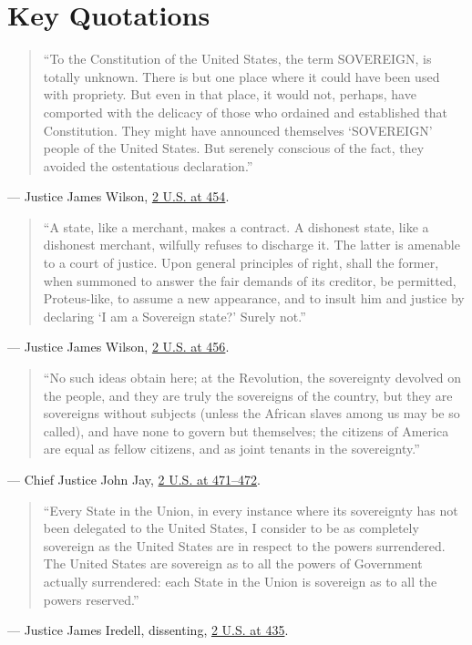 \documentclass[12pt]{article}
\begin{document}
\section{Key Quotations}
\begin{quote}
``To the Constitution of the United States, the term SOVEREIGN, is totally unknown. There is but one place where it could have been used with propriety. But even in that place, it would not, perhaps, have comported with the delicacy of those who ordained and established that Constitution. They might have announced themselves `SOVEREIGN' people of the United States. But serenely conscious of the fact, they avoided the ostentatious declaration.''
\end{quote}
\noindent --- Justice James Wilson, \href{https://supreme.justia.com/cases/federal/us/2/419/}{2 U.S. at 454}.

\begin{quote}
``A state, like a merchant, makes a contract. A dishonest state, like a dishonest merchant, wilfully refuses to discharge it. The latter is amenable to a court of justice. Upon general principles of right, shall the former, when summoned to answer the fair demands of its creditor, be permitted, Proteus-like, to assume a new appearance, and to insult him and justice by declaring `I am a Sovereign state?' Surely not.''
\end{quote}
\noindent --- Justice James Wilson, \href{https://supreme.justia.com/cases/federal/us/2/419/}{2 U.S. at 456}.

\begin{quote}
``No such ideas obtain here; at the Revolution, the sovereignty devolved on the people, and they are truly the sovereigns of the country, but they are sovereigns without subjects (unless the African slaves among us may be so called), and have none to govern but themselves; the citizens of America are equal as fellow citizens, and as joint tenants in the sovereignty.''
\end{quote}
\noindent --- Chief Justice John Jay, \href{https://supreme.justia.com/cases/federal/us/2/419/}{2 U.S. at 471--472}.

\begin{quote}
``Every State in the Union, in every instance where its sovereignty has not been delegated to the United States, I consider to be as completely sovereign as the United States are in respect to the powers surrendered. The United States are sovereign as to all the powers of Government actually surrendered: each State in the Union is sovereign as to all the powers reserved.''
\end{quote}
\noindent --- Justice James Iredell, dissenting, \href{https://supreme.justia.com/cases/federal/us/2/419/}{2 U.S. at 435}.
\end{document}

